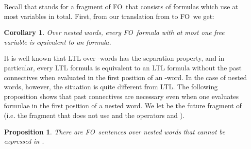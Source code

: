 \documentclass{LMCS}
\newcommand{\OMIT}[1]{}
\newcommand{\FO}{{\rm FO}}
\newcommand{\fth}{\hfill }
\theoremstyle{plain}
\newtheorem{corollary}[theorem]{Corollary}
\newtheorem{proposition}[theorem]{Proposition}
\theoremstyle{definition}
\begin{document}
Recall that  stands for a fragment of \FO\ that consists of
formulas which use at most  variables in total.
First, from our
translation from  to \FO\ we get:
\begin{corollary}
Over nested words,
every \FO\ formula with at most one free variable is equivalent to an
 formula.
\end{corollary}


\OMIT{

Furthermore, for \FO\ {\em sentences}, we can eliminate the since operator.


\begin{corollary}
\label{nwtl-cor}
For every \FO\ sentence  over finite or infinite nested words,
there is a formula  of  that does not use the since
operator  such that  iff .
\end{corollary}

{\em Proof}. 
In the proof of Theorem \ref{nwtl-thm}, we show that every \FO\
sentence over a nested word  can be translated into an
\FO\ sentence over the tree , and then, by the separation property
of  \cite{marx-pods04} is equivalent to a  formula
that does not use  and . Then, given that in the translation
of  into  we only use  in the rule
, we see that the
equivalent  formula does not use . Thus, given that in the
proof of Lemma \ref{nwtl-lemma-one}, no since operator is used in the
translations of  into  and  into , the
corollary follows for the finite case.

For the infinite case, we note that in the proof of Theorem
\ref{nwtl-thm}, for the case of \FO\ sentences we only need to specify
the type of  where  is the root. Thus, one can see
that in this case the use of  in  formulas is not
required, and hence the resulting formulas are translated into
 formulas without .
\fth
}

It is well known that LTL over -words has the separation
property, and in particular, every LTL formula is equivalent to an LTL
formula without the past connectives when evaluated in the first
position of an -word. In the case of nested words, however,
the situation is quite different from LTL. The following proposition
shows that past connectives are necessary even when one evaluates
formulae in the first position of a nested word.  We let  be
the future fragment of  (i.e. the fragment that does not use
 and the operators  and ).

\begin{proposition}
\label{nwtlf-prop}
There are \FO\ sentences over nested words that cannot be expressed in
.
\end{proposition}
\end{document}

